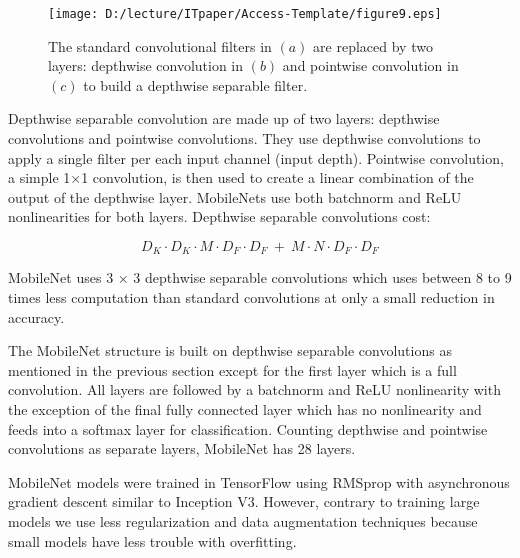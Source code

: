 \documentclass{ieeeaccess}
\begin{document}
\begin{figure}
	\centering
		\texttt{[image: D:/lecture/ITpaper/Access-Template/figure9.eps]}
	\caption {The standard convolutional filters in $(a)$ are replaced by two layers: depthwise convolution in $(b)$ and pointwise convolution in $(c)$ to build a depthwise separable filter.}
	\label{fig:figure9}
\end{figure}

Depthwise separable convolution are made up of two layers: depthwise convolutions and pointwise convolutions. They use depthwise convolutions to apply a single filter per each input channel (input depth). Pointwise convolution, a simple 1×1 convolution, is then used to create a linear combination of the output of the depthwise layer. MobileNets use both batchnorm and ReLU nonlinearities for both layers. Depthwise separable convolutions cost:

\begin{equation}
	\label{equation7}
	 D_K \cdot D_K \cdot M \cdot D_F \cdot D_F \ + \ M \cdot N \cdot D_F \cdot D_F 
\end{equation}

MobileNet uses 3 × 3 depthwise separable convolutions which uses between 8 to 9 times less computation than standard convolutions at only a small reduction in accuracy.

The MobileNet structure is built on depthwise separable convolutions as mentioned in the previous section except for the first layer which is a full convolution.  All layers are followed by a batchnorm and ReLU nonlinearity with the exception of the final fully connected layer which has no nonlinearity and feeds into a softmax layer for classification. Counting depthwise and pointwise convolutions as separate layers, MobileNet has 28 layers.

MobileNet models were trained in TensorFlow using RMSprop with asynchronous gradient descent similar to Inception V3. However, contrary to training large models we use less regularization and data augmentation techniques because small models have less trouble with overfitting.
\end{document}
